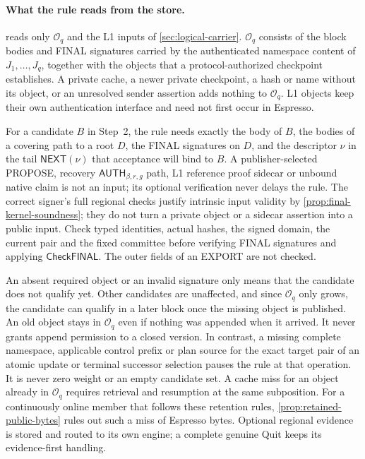 \documentclass[11pt,a4paper]{article}
\newcommand{\tagg}[1]{\ensuremath{\mathsf{#1}}}
\newcounter{protocol}
\begin{document}
\paragraph{What the rule reads from the store.}
\label{sec:record-completeness}
 reads only $\mathcal O_q$ and the L1 inputs of
\cref{sec:logical-carrier}. $\mathcal O_q$ consists of the block bodies
and FINAL signatures carried by the authenticated namespace content of
$J_1,\ldots,J_q$, together with the objects that a protocol-authorized
checkpoint establishes. A private cache, a newer private checkpoint, a
hash or name without its object, or an unresolved sender assertion adds
nothing to $\mathcal O_q$. L1 objects keep their own authentication
interface and need not first occur in Espresso.

For a candidate $B$ in Step~2, the rule needs exactly the body of $B$,
the bodies of a covering path to a root $D$, the FINAL signatures on
$D$, and the descriptor $\nu$ in the tail $\tagg{NEXT}(\nu)$ that
acceptance will bind to
$B$. A publisher-selected PROPOSE,
recovery $\tagg{AUTH}_{\beta,r,g}$ path, L1 reference proof sidecar or unbound
native claim is not an input; its optional verification never delays the
rule. The correct signer's full regional checks justify intrinsic input
validity by \cref{prop:final-kernel-soundness}; they do not turn a
private object or a sidecar assertion into a public input. Check typed
identities, actual hashes, the signed domain, the current pair and the
fixed committee before verifying FINAL signatures and applying
\tagg{CheckFINAL}. The outer fields of an EXPORT are not checked.

An absent required object or an invalid signature only means that the
candidate does not qualify yet. Other candidates are unaffected, and
since $\mathcal O_q$ only grows, the candidate can qualify in a later
block once the missing object is published. An old object stays in
$\mathcal O_q$ even if nothing was appended when it arrived. It never
grants append permission to a closed version. In contrast, a missing
complete namespace, applicable control prefix or plan source for
the exact target pair of an atomic update or terminal successor selection
pauses the rule at that operation. It is never zero
weight or an empty candidate set. A cache miss for an object already in
$\mathcal O_q$ requires retrieval and resumption at the same
subposition. For a continuously online member that follows these
retention rules, \cref{prop:retained-public-bytes} rules out such a miss
of Espresso bytes. Optional regional evidence is
stored and routed to its own engine; a complete genuine Quit keeps its
evidence-first handling.
\end{document}
